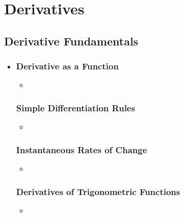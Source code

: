 \chapter{Derivatives}

\section{Derivative Fundamentals}
\begin{itemize}
  \item []
  
  \subsection{Derivative as a Function}
  \begin{itemize}
    \item 
  \end{itemize}

  \subsection{Simple Differentiation Rules}
  \begin{itemize}
    \item 
  \end{itemize}

  \subsection{Instantaneous Rates of Change}
  \begin{itemize}
    \item 
  \end{itemize}

  \subsection{Derivatives of Trigonometric Functions}
  \begin{itemize}
    \item 
  \end{itemize}
  

\end{itemize}

